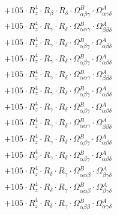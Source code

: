 \documentclass{article}
\begin{document}
\begin{subequations}
\begin{gather}
\begin{array}{c}
 \\[0.2em] 		 + 105 \cdot R_{z}^{4} \cdot R_{\beta{}} \cdot R_{\delta{}} \cdot \Omega{}^{B}_{\alpha{}\beta{}\gamma{}} \cdot \Omega{}^{A}_{\alpha{}\gamma{}\delta{}} 
 \\[0.2em] 		 + 105 \cdot R_{z}^{4} \cdot R_{\gamma{}} \cdot R_{\delta{}} \cdot \Omega{}^{B}_{\alpha{}\alpha{}\gamma{}} \cdot \Omega{}^{A}_{\beta{}\beta{}\delta{}} 
 \\[0.2em] 		 + 105 \cdot R_{z}^{4} \cdot R_{\gamma{}} \cdot R_{\delta{}} \cdot \Omega{}^{B}_{\alpha{}\beta{}\gamma{}} \cdot \Omega{}^{A}_{\alpha{}\beta{}\delta{}} 
 \\[0.2em] 		 + 105 \cdot R_{z}^{4} \cdot R_{\gamma{}} \cdot R_{\delta{}} \cdot \Omega{}^{B}_{\alpha{}\beta{}\gamma{}} \cdot \Omega{}^{A}_{\alpha{}\beta{}\delta{}} 
 \\[0.2em] 		 + 105 \cdot R_{z}^{4} \cdot R_{\gamma{}} \cdot R_{\delta{}} \cdot \Omega{}^{B}_{\alpha{}\alpha{}\gamma{}} \cdot \Omega{}^{A}_{\beta{}\beta{}\delta{}} 
 \\[0.2em] 		 + 105 \cdot R_{z}^{4} \cdot R_{\gamma{}} \cdot R_{\delta{}} \cdot \Omega{}^{B}_{\alpha{}\beta{}\gamma{}} \cdot \Omega{}^{A}_{\alpha{}\beta{}\delta{}} 
 \\[0.2em] 		 + 105 \cdot R_{z}^{4} \cdot R_{\gamma{}} \cdot R_{\delta{}} \cdot \Omega{}^{B}_{\alpha{}\beta{}\gamma{}} \cdot \Omega{}^{A}_{\alpha{}\beta{}\delta{}} 
 \\[0.2em] 		 + 105 \cdot R_{z}^{4} \cdot R_{\gamma{}} \cdot R_{\delta{}} \cdot \Omega{}^{B}_{\alpha{}\alpha{}\gamma{}} \cdot \Omega{}^{A}_{\beta{}\beta{}\delta{}} 
 \\[0.2em] 		 + 105 \cdot R_{z}^{4} \cdot R_{\gamma{}} \cdot R_{\delta{}} \cdot \Omega{}^{B}_{\alpha{}\beta{}\gamma{}} \cdot \Omega{}^{A}_{\alpha{}\beta{}\delta{}} 
 \\[0.2em] 		 + 105 \cdot R_{z}^{4} \cdot R_{\gamma{}} \cdot R_{\delta{}} \cdot \Omega{}^{B}_{\alpha{}\beta{}\gamma{}} \cdot \Omega{}^{A}_{\alpha{}\beta{}\delta{}} 
 \\[0.2em] 		 + 105 \cdot R_{z}^{4} \cdot R_{\delta{}} \cdot R_{\gamma{}} \cdot \Omega{}^{B}_{\alpha{}\alpha{}\beta{}} \cdot \Omega{}^{A}_{\beta{}\gamma{}\delta{}} 
 \\[0.2em] 		 + 105 \cdot R_{z}^{4} \cdot R_{\delta{}} \cdot R_{\gamma{}} \cdot \Omega{}^{B}_{\alpha{}\alpha{}\beta{}} \cdot \Omega{}^{A}_{\beta{}\gamma{}\delta{}} 
 \\[0.2em] 		 + 105 \cdot R_{z}^{4} \cdot R_{\delta{}} \cdot R_{\gamma{}} \cdot \Omega{}^{B}_{\alpha{}\beta{}\beta{}} \cdot \Omega{}^{A}_{\alpha{}\gamma{}\delta{}} 

\end{array}
\end{gather}
\end{subequations}
\end{document}
